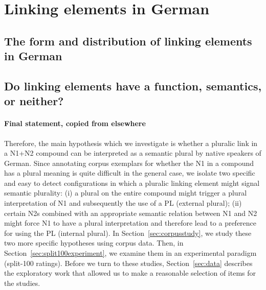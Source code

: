 \section{Linking elements in German}
\label{sec:linkingelementsingerman}

\subsection{The form and distribution of linking elements in German}
\label{sec:theformanddistributionoflinkingelementsingerman}

\subsection{Do linking elements have a function, semantics, or neither?}
\label{sub:dolinkingelementshaveafunctionsemanticsorneither}



\paragraph{Final statement, copied from elsewhere}

Therefore, the main hypothesis which we investigate is whether a pluralic link in a N1+N2 compound can be interpreted as a semantic plural by native speakers of German.
Since annotating corpus exemplars for whether the N1 in a compound has a plural meaning is quite difficult in the general case, we isolate two specific and easy to detect configurations in which a pluralic linking element might signal semantic plurality:
(i) a plural on the entire compound might trigger a plural interpretation of N1 and subsequently the use of a PL (external plural);
(ii) certain N2s combined with an appropriate semantic relation between N1 and N2 might force N1 to have a plural interpretation and therefore lead to a preference for using the PL (internal plural).
In Section~\ref{sec:corpusstudy}, we study these two more specific hypotheses using corpus data.
Then, in Section~\ref{sec:split100experiment}, we examine them in an experimental paradigm (split-100 ratings).
Before we turn to these studies, Section~\ref{sec:data} describes the exploratory work that allowed us to make a reasonable selection of items for the studies.
